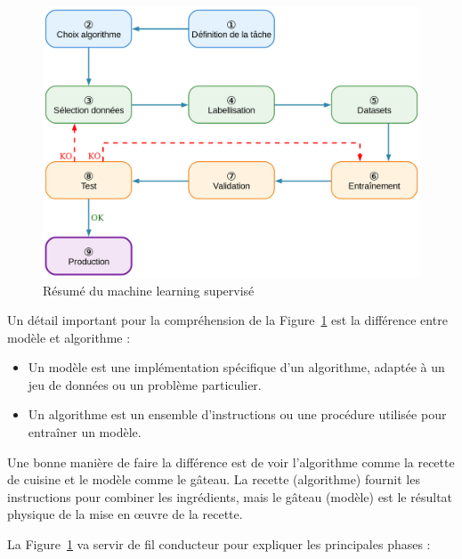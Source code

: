\begin{figure}[H]
    \centering
    \includegraphics[width=1\linewidth]{03-tail/A1_fondamentaux_ML/A1_figures/A1_01_resume_machine_learning_supervise.png}
    \caption{Résumé du machine learning supervisé}
    \label{fig:A1_01_resume_machine_learning_supervise}
\end{figure}


\par{Un détail important pour la compréhension de la Figure~\ref{fig:A1_01_resume_machine_learning_supervise} est la différence entre modèle et algorithme :
\begin{itemize}
    \item Un modèle est une implémentation spécifique d'un algorithme, adaptée à un jeu de données ou un problème particulier.
    \item Un algorithme est un ensemble d'instructions ou une procédure utilisée pour entraîner un modèle.
\end{itemize}
}

\par{Une bonne manière de faire la différence est de voir l'algorithme comme la recette de cuisine et le modèle comme le gâteau. La recette (algorithme) fournit les instructions pour combiner les ingrédients, mais le gâteau (modèle) est le résultat physique de la mise en œuvre de la recette.}

\par{La Figure~\ref{fig:A1_01_resume_machine_learning_supervise} va servir de fil conducteur pour expliquer les principales phases :}

